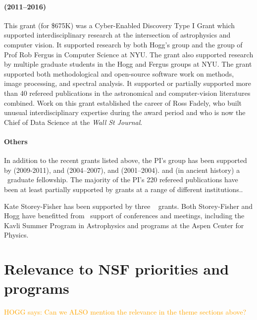 \documentclass[12pt, fullpage, letterpaper]{article}
\newcommand{\HOGG}[1]{\textcolor{orange}{HOGG says: #1}}
\begin{document}
\paragraph{
 (2011--2016)}
This grant (for \$675K) was a Cyber-Enabled Discovery Type I Grant
which supported interdisciplinary research at the intersection of
astrophysics and computer vision.  It supported research by both
Hogg's group and the group of Prof Rob Fergus in Computer Science at
NYU.
The grant also supported research by multiple graduate students in the
Hogg and Fergus groups at NYU.
The grant supported both methodological and open-source software work
on  methods, image processing, and spectral analysis.
It supported or partially supported
more than 40 refereed publications in the astronomical and
computer-vision literatures combined.
Work on this grant established the career of Ross Fadely, who built unusual
interdisciplinary expertise during the award period and who is now the
Chief of Data Science at the \textit{Wall St Journal}.

\paragraph{Others}
In addition to the recent grants listed above, the PI's group has been supported by
 (2009-2011),
and
 (2004--2007),
and
 (2001--2004).
and (in ancient history) a \NSF\ graduate fellowship.
The majority of the PI's 220 refereed publications have been at least partially supported
by \NSF grants at a range of different institutions..

Kate Storey-Fisher has been supported by three \NSF\  grants.
Both Storey-Fisher and Hogg have benefitted from \NSF\ support of conferences and meetings,
including the Kavli Summer Program in Astrophysics and programs at the Aspen Center for Physics.

\section{Relevance to NSF priorities and programs}

\HOGG{Can we ALSO mention the  relevance in
the theme sections above?}
\end{document}
